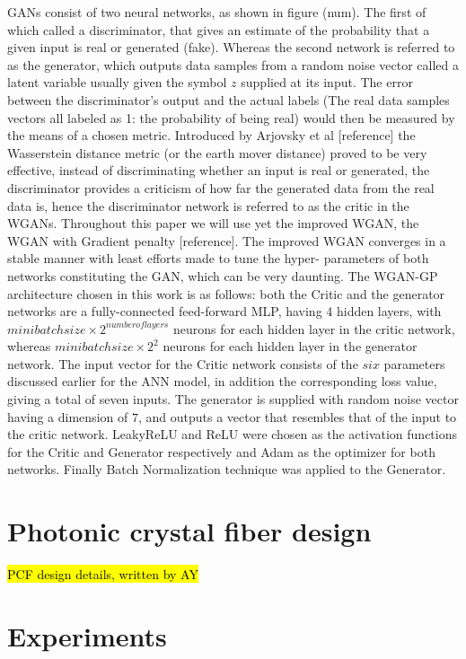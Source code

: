 \documentclass[draft, a4, 10pt, onecolumn]{IEEEtran}
\begin{document}
GANs consist of two neural networks, as shown in figure (num). The first of which called a discriminator, that gives an estimate of the probability that a given input is real or generated (fake). Whereas the second network is referred to as the generator, which outputs data samples from a random noise vector called a latent variable usually given the symbol $z$ supplied at its input. The error between the discriminator’s output and the actual labels (The real data samples vectors all labeled as 1: the probability of being real) would then be measured by the means of a chosen metric. Introduced by Arjovsky et al [reference] the Wasserstein distance metric (or the earth mover distance) proved to be very effective, instead of discriminating whether an input is real or generated, the discriminator provides a criticism of how far the generated data from the real data is, hence the discriminator network is referred to as the critic in the WGANs. Throughout this paper we will use yet the improved WGAN, the WGAN with Gradient penalty [reference]. The improved WGAN converges in a stable manner with least efforts made to tune the hyper- parameters of both networks constituting the GAN, which can be very daunting.
The WGAN-GP architecture chosen in this work is as follows: both the Critic and the generator networks are a fully-connected feed-forward MLP, having 4 hidden layers, with $ minibatchsize\times2^{number of layers} $ neurons for each hidden layer in the critic network, whereas $ minibatchsize\times2^{2} $ neurons for each hidden layer in the generator network. The input vector for the Critic network consists of the $six$ parameters discussed earlier for the ANN model, in addition the corresponding loss value, giving a total of seven inputs. The generator is supplied with random noise vector having a dimension of $7$, and outputs a vector that resembles that of the input to the critic network. LeakyReLU and ReLU were chosen as the activation functions for the Critic and Generator respectively and Adam as the optimizer for both networks. Finally Batch Normalization technique was applied to the Generator.
\newpage
\section{Photonic crystal fiber design}
\label{sec:pcf}

\hl{PCF design details, written by AY}

\section{Experiments}
\label{sec:exp}
\end{document}
